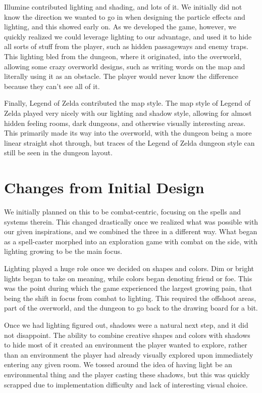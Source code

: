 \documentclass{sigchi}
\begin{document}
Illumine contributed lighting and shading, and lots of it.  We initially did not know the direction we wanted to go in when designing the particle effects and lighting, and this
showed early on.  As we developed the game, however, we quickly realized we could leverage lighting to our advantage, and used it to hide all sorts of stuff from the player, such
as hidden passageways and enemy traps.  This lighting bled from the dungeon, where it originated, into the overworld, allowing some crazy overworld designs, such as writing words on the map and literally using it as an obstacle.  The player would never know the difference because they can't see all of it.

Finally, Legend of Zelda contributed the map style.  The map style of Legend of Zelda played very nicely with our lighting and shadow style, allowing for almost hidden feeling rooms,
dark dungeons, and otherwise visually interesting areas.  This primarily made its way into the overworld, with the dungeon being a more linear straight shot through, but traces of the Legend of Zelda dungeon style can still be seen in the dungeon layout.

\section{Changes from Initial Design}
We initially planned on this to be combat-centric, focusing on the spells and systems therein.  This changed drastically once we realized what was possible with our given inspirations, and we combined the three in a different way.  What began as a spell-caster morphed into an exploration game with combat on the side, with lighting growing to be the main focus.

Lighting played a huge role once we decided on shapes and colors.  Dim or bright lights began to take on meaning, while colors began denoting friend or foe.  This was the point during which the game experienced the largest growing pain, that being the shift in focus from combat to lighting.  This required the offshoot areas, part of the overworld, and the dungeon to go back to the drawing board for a bit.

Once we had lighting figured out, shadows were a natural next step, and it did not disappoint.  The ability to combine creative shapes and colors with shadows to hide most of it created an environment the player wanted to explore, rather than an environment the player had already visually explored upon immediately entering any given room.  We tossed around the idea of having light be an environmental thing and the player casting these shadows, but this was quickly scrapped due to implementation difficulty and lack of interesting visual choice.
\end{document}

